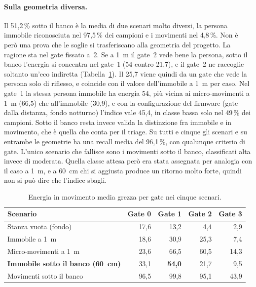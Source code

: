 \paragraph{Sulla geometria diversa.} Il 51,2\,\% sotto il banco è la media di due scenari molto diversi, la persona immobile riconosciuta nel 97,5\,\% dei campioni e i movimenti nel 4,8\,\%. Non è però una prova che le soglie si trasferiscano alla geometria del progetto. La ragione sta nel gate fissato a~2. Se a 1~m il gate~2 vede bene la persona, sotto il banco l'energia si concentra nel gate~1 (54 contro 21,7), e il gate~2 ne raccoglie soltanto un'eco indiretta (Tabella~\ref{tab:vitalita-gate}). Il 25,7 viene quindi da un gate che vede la persona solo di riflesso, e coincide con il valore dell'immobile a 1~m per caso. Nel gate~1 la stessa persona immobile ha energia 54, più vicina ai micro-movimenti a 1~m (66,5) che all'immobile (30,9), e con la configurazione del firmware (gate dalla distanza, fondo notturno) l'indice vale 45,4, in classe bassa solo nel 49\,\% dei campioni. Sotto il banco resta invece valida la distinzione fra immobile e in movimento, che è quella che conta per il triage. Su tutti e cinque gli scenari e su entrambe le geometrie ha una recall media del 96,1\,\%, con qualunque criterio di gate. L'unico scenario che fallisce sono i movimenti sotto il banco, classificati alta invece di moderata. Quella classe attesa però era stata assegnata per analogia con il caso a 1~m, e a 60~cm chi si aggiusta produce un ritorno molto forte, quindi non si può dire che l'indice sbagli.

\begin{table}[htbp]
\centering
\caption{Energia in movimento media grezza per gate nei cinque scenari.}
\label{tab:vitalita-gate}
\small
\begin{tabular}{@{}lrrrr@{}}
\toprule
Scenario & Gate 0 & Gate 1 & Gate 2 & Gate 3 \\
\midrule
Stanza vuota (fondo) & 17,6 & 13,2 & 4,4 & 2,9 \\
Immobile a 1~m & 18,6 & 30,9 & 25,3 & 7,4 \\
Micro-movimenti a 1~m & 23,6 & 66,5 & 60,5 & 14,3 \\
\textbf{Immobile sotto il banco (60~cm)} & 33,1 & \textbf{54,0} & 21,7 & 9,5 \\
Movimenti sotto il banco & 96,5 & 99,8 & 95,1 & 43,9 \\
\bottomrule
\end{tabular}
\end{table}

